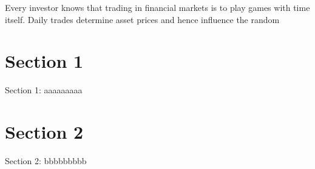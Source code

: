 \minitoc

\vspace{0.5cm}
Every investor knows that trading in financial markets is to play
games with time itself. Daily trades determine asset prices and hence
influence the random 

\section{Section 1}
Section 1: aaaaaaaaa

\section{Section 2}
Section 2: bbbbbbbbb